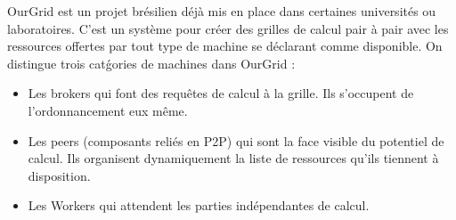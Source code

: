 \documentclass[12pt,a4paper]{article}
\begin{document}
OurGrid est un projet br\'esilien d\'ejà mis en place dans certaines universit\'es ou laboratoires. C'est un système pour
cr\'eer des grilles de calcul pair à pair avec les ressources offertes par tout type de machine se d\'eclarant comme disponible.
On distingue trois cat\'gories de machines dans OurGrid :
\begin{itemize}
    \item Les brokers qui font des requêtes de calcul à la grille. Ils s'occupent de l'ordonnancement eux même.
    \item Les peers (composants reli\'es en P2P) qui sont la face visible du potentiel de calcul. Ils organisent dynamiquement
        la liste de ressources qu'ils tiennent à disposition.
    \item Les Workers qui attendent les parties ind\'ependantes de calcul.
        
\end{itemize}
\end{document}
